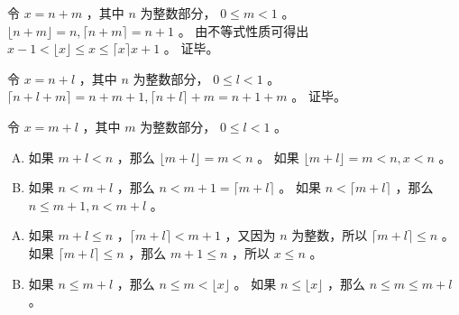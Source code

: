 {{        %
        \begin{practices}
            令 $x = n + m$ ，其中 $n$ 为整数部分， $0 \leq m < 1$ 。
            $\lfloor n + m \rfloor = n, \lceil n + m \rceil = n + 1$ 。
            由不等式性质可得出 $x - 1 < \lfloor x \rfloor \leq x \leq \lceil x \rceil x + 1$ 。
            证毕。
        \end{practices}

        \begin{practices}
            令 $x = n + l$ ，其中 $n$ 为整数部分， $0 \leq l < 1$ 。
            $\lceil n + l + m \rceil = n + m + 1, \lceil n + l \rceil + m = n + 1 + m$ 。
            证毕。
        \end{practices}

        \begin{practices}
            令 $x = m + l$ ，其中 $m$ 为整数部分， $0 \leq l < 1$ 。

            \begin{enumerate}[A.]
                \item
                {
                    如果 $m + l < n$ ，那么 $\lfloor m + l \rfloor = m < n$ 。
                    如果 $\lfloor m + l \rfloor = m < n, x < n$ 。
                }
                \item
                {
                    如果 $n < m + l$ ，那么 $n < m + 1 = \lceil m + l \rceil$ 。
                    如果 $n < \lceil m + l \rceil$ ，那么 $ n \leq m + 1, n < m + l$ 。
                }
            \end{enumerate}
        \end{practices}

        \begin{practices}
            \begin{enumerate}[A.]
                \item
                {
                    如果 $m + l \leq n$ ，$\lceil m + l \rceil < m + 1$ ，又因为 $n$ 为整数，所以 $\lceil m + l \rceil \leq n$ 。
                    如果 $\lceil m + l \rceil \leq n$ ，那么 $m + 1 \leq n$ ，所以 $x \leq n$ 。
                }
                \item
                {
                    如果 $n \leq m + l$ ，那么 $n \leq m < \lfloor x \rfloor$ 。
                    如果 $n \leq \lfloor x \rfloor$ ，那么 $n \leq m \leq m + l$ 。
                }
            \end{enumerate}
        \end{practices}

}}
